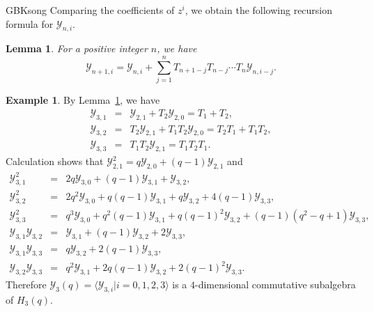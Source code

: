 \documentclass[13pt,a4paper, oneside]{amsart}       %
\numberwithin{equation}{section}
\newtheorem{lemma}[equation]{Lemma}
\theoremstyle{definition}
\newtheorem{example}[equation]{Example}
\theoremstyle{remark}
\begin{document}
\begin{CJK*}{GBK}{song}
Comparing the coefficients of $z^i$, we obtain the following recursion formula for $\mathscr{Y}_{n,i}$.

\begin{lemma}\label{Lemm:Recursion-formula}
For a positive integer $n$, we have
 \begin{equation*}
 \mathscr{Y}_{n+1,i}=\mathscr{Y}_{n,i}+
\sum_{j=1}^{n}T_{n+1-j}T_{n-j}\cdots T_n\mathscr{Y}_{n,i-j}.
 \end{equation*}
\end{lemma}



\begin{example} By Lemma~\ref{Lemm:Recursion-formula}, we have
\begin{eqnarray*}
  \mathscr{Y}_{3,1}&=&\mathscr{Y}_{2,1}+T_2\mathscr{Y}_{2,0}=T_1+T_2,\\
 \mathscr{Y}_{3,2}&=&T_2\mathscr{Y}_{2,1}+T_1T_2\mathscr{Y}_{2,0}=T_2T_1+T_1T_2,\\
 \mathscr{Y}_{3,3}&=&T_1T_2\mathscr{Y}_{2,1}=T_1T_2T_1.
 \end{eqnarray*}
Calculation shows that $\mathscr{Y}_{2,1}^2=q\mathscr{Y}_{2,0}+(q-1)\mathscr{Y}_{2,1}$ and  \begin{eqnarray*}
 \mathscr{Y}_{3,1}^2&=&2q\mathscr{Y}_{3,0}+(q-1)\mathscr{Y}_{3,1}+\mathscr{Y}_{3,2},\\
\mathscr{Y}_{3,2}^2&=&2q^2\mathscr{Y}_{3,0}+q(q-1)\mathscr{Y}_{3,1}
+q\mathscr{Y}_{3,2}+ 4(q-1)\mathscr{Y}_{3,3},\\
 \mathscr{Y}_{3,3}^2&=&q^3\mathscr{Y}_{3,0}+q^2(q-1)\mathscr{Y}_{3,1}+
 q(q-1)^2\mathscr{Y}_{3,2}+(q-1)(q^2-q+1)\mathscr{Y}_{3,3},\\
 \mathscr{Y}_{3,1}\mathscr{Y}_{3,2}&=&
 \mathscr{Y}_{3,1}+(q-1)\mathscr{Y}_{3,2}+2\mathscr{Y}_{3,3},\\
 \mathscr{Y}_{3,1}\mathscr{Y}_{3,3}&=&
 q\mathscr{Y}_{3,2}+2(q-1)\mathscr{Y}_{3,3},\\
 \mathscr{Y}_{3,2}\mathscr{Y}_{3,3}&=&
 q^2\mathscr{Y}_{3,1}+2q(q-1)\mathscr{Y}_{3,2}+2(q-1)^2\mathscr{Y}_{3,3}.
 \end{eqnarray*}
 Therefore $\mathscr{Y}_3(q)=\langle \mathscr{Y}_{3,i}|i=0,1,2,3 \rangle$ is a $4$-dimensional commutative subalgebra of $H_3(q)$.
 \end{example}


\end{CJK*}
\end{document}

